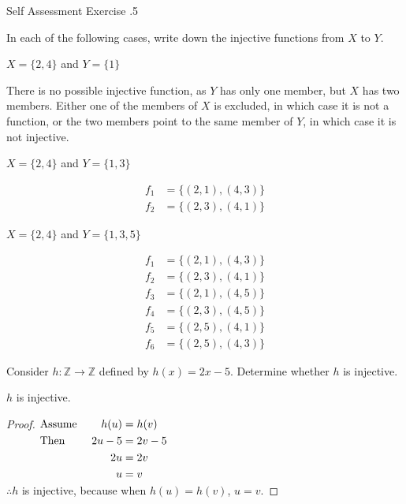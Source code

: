 \documentclass[\main/notes.tex]{subfiles}
\begin{document}
				\begin{exercise}{Self Assessment Exercise \thechapter.5}
					\begin{questions}
						\item In each of the following cases, write down the injective functions from $X$ to $Y$.
							\begin{questions}
								\item $X = \{2, 4\}$ and $Y = \{1\}$\\
									\begin{answer}
										There is no possible injective function, as $Y$ has only one member, but $X$ has two members. Either one of the members of $X$ is excluded, in which case it is not a function, or the two members point to the same member of $Y$, in which case it is not injective.
									\end{answer}
								\item $X = \{2, 4\}$ and $Y = \{1, 3\}$
									\begin{answer}
										\begin{align*}
											f_{1} &= \bigl\{(2, 1), (4, 3)\bigr\}\\
											f_{2} &= \bigl\{(2, 3), (4, 1)\bigr\}
										\end{align*}
									\end{answer}
								\item $X = \{2, 4\}$ and $Y = \{1, 3, 5\}$
									\begin{answer}
										\begin{align*}
											f_{1} &= \bigl\{(2, 1), (4, 3)\bigr\}\\
											f_{2} &= \bigl\{(2, 3), (4, 1)\bigr\}\\
											f_{3} &= \bigl\{(2, 1), (4, 5)\bigr\}\\
											f_{4} &= \bigl\{(2, 3), (4, 5)\bigr\}\\
											f_{5} &= \bigl\{(2, 5), (4, 1)\bigr\}\\
											f_{6} &= \bigl\{(2, 5), (4, 3)\bigr\}
										\end{align*}
									\end{answer}
							\end{questions}
						\item Consider $h: \mathbb{Z} \rightarrow \mathbb{Z}$ defined by $h(x) = 2x - 5$. Determine whether $h$ is injective.\\
							\begin{answer}
								$h$ is injective.
								\begin{proof} $
									\begin{alignedat}[t]{2}
										& \text{Assume } \quad &h(u) &= h(v)\\
										& \text{Then } &2u - 5 &= 2v - 5\\
										& & 2u &= 2v\\
										& & u &= v
									\end{alignedat} $\\
									$\therefore h$ is injective, because when $h(u) = h(v)$, $u = v$.
								\end{proof}
							\end{answer}
					\end{questions}
				\end{exercise}
\end{document}
